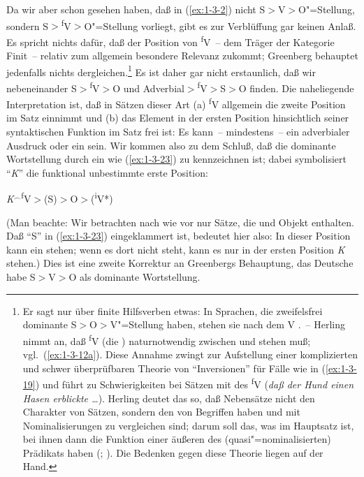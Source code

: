 \documentclass[output=paper]{langsci/langscibook}
\begin{document}
Da wir aber schon gesehen haben, daß in (\ref{ex:1-3-2}) nicht
S$>$V$>$O"=Stellung, sondern S$>$\textsuperscript{f}V$>$O"=Stellung
vorliegt, gibt es zur Verblüffung gar keinen Anlaß. Es spricht nichts
dafür, daß der Position von \textsuperscript{f}V~-- dem Träger der
Kategorie Finit~-- relativ zum  allgemein besondere Relevanz
zukommt; Greenberg behauptet jedenfalls nichts
dergleichen.\footnote{%
  Er sagt nur über finite Hilfsverben etwas: In
  Sprachen, die zweifelsfrei dominante S$>$O$>$V"=Stellung haben,
  stehen sie nach dem V \citep[84]{Greenberg1963}.~-- Herling
  nimmt an, daß \textsuperscript{f}V (die ) naturnotwendig
  zwischen  und  stehen muß;
  vgl.\ (\ref{ex:1-3-12a}). Diese Annahme zwingt zur Aufstellung einer
  komplizierten und schwer überprüfbaren Theorie von "`Inversionen"' für
  Fälle wie in (\ref{ex:1-3-19}) und führt zu Schwierigkeiten bei
  Sätzen mit  des \textsuperscript{f}V (\zb \emph{daß der
  Hund einen Hasen erblickte \ldots}). Herling deutet das so, daß
  Nebensätze nicht den Charakter von Sätzen, sondern den von Begriffen
  haben und mit Nominalisierungen zu vergleichen sind; darum soll das,
  was im Hauptsatz  ist, bei ihnen dann die Funktion einer
  äußeren  des (quasi"=nominalisierten) Prädikats
  haben (\citeyear*[319ff]{Herling1821T}; \citeyear[89f]{Herling1830}). Die Bedenken gegen
  diese Theorie liegen auf der Hand.%
}
Es ist daher gar nicht erstaunlich, daß wir nebeneinander S$>$\textsuperscript{f}V$>$O und
Adverbial$>$\textsuperscript{f}V$>$S$>$O finden. Die naheliegende
Interpretation ist, daß in Sätzen dieser Art (a) \textsuperscript{f}V
allgemein die zweite Position im Satz einnimmt und (b) das Element in
der
ersten Position hinsichtlich seiner syntaktischen Funktion im Satz frei ist: Es kann~-- mindestens~-- ein adverbialer Ausdruck oder ein  sein. Wir kommen also zu
dem Schluß, daß die dominante Wortstellung durch ein  wie (\ref{ex:1-3-23}) zu kennzeichnen ist; dabei symbolisiert "`\textit{K}"' die funktional unbestimmte erste Position:
\begin{exe}
\ex\label{ex:1-3-23}
\textit{K}$^{\smallfrown}$\textsuperscript{f}V$>$(S)$>$O$>$(\textsuperscript{i}V*)
\end{exe}
(Man beachte: Wir betrachten nach wie vor nur Sätze, die  und Objekt enthalten. Daß "`S"' in (\ref{ex:1-3-23}) eingeklammert ist, bedeutet hier also: In dieser Position kann ein
 stehen; wenn es dort nicht steht, kann es nur in der ersten Position \textit{K} stehen.)
Dies ist eine zweite Korrektur an Greenbergs Behauptung, das Deutsche habe
S$>$V$>$O als dominante Wortstellung.
\end{document}
